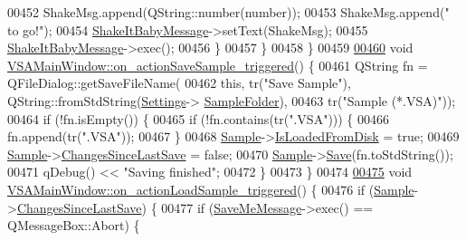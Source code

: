 \begin{DoxyCode}
{00452       ShakeMsg.append(QString::number(number));
00453       ShakeMsg.append(\textcolor{stringliteral}{" to go!"});
00454       \hyperlink{class_v_s_a_main_window_a819fbdf1137bb5f88c6638b0a9213f8c}{ShakeItBabyMessage}->setText(ShakeMsg);
00455       \hyperlink{class_v_s_a_main_window_a819fbdf1137bb5f88c6638b0a9213f8c}{ShakeItBabyMessage}->exec();
00456     \}
00457   \}
00458 \}
00459 
\hypertarget{vsamainwindow_8cpp_source_l00460}{}\hyperlink{class_v_s_a_main_window_a343178f350d9f2cb3067c75f995169f3}{00460} \textcolor{keywordtype}{void} \hyperlink{class_v_s_a_main_window_a343178f350d9f2cb3067c75f995169f3}{VSAMainWindow::on\_actionSaveSample\_triggered}() \{
00461   QString fn = QFileDialog::getSaveFileName(
00462       \textcolor{keyword}{this}, tr(\textcolor{stringliteral}{"Save Sample"}), QString::fromStdString(\hyperlink{class_v_s_a_main_window_a429310b9a60f66c4283dc609f869b48d}{Settings}->
      \hyperlink{class_soil_analyzer_1_1_soil_settings_adfd46a349d927988c955fa064fc7bf1a}{SampleFolder}),
00463       tr(\textcolor{stringliteral}{"Sample (*.VSA)"}));
00464   \textcolor{keywordflow}{if} (!fn.isEmpty()) \{
00465     \textcolor{keywordflow}{if} (!fn.contains(tr(\textcolor{stringliteral}{".VSA"}))) \{
00466       fn.append(tr(\textcolor{stringliteral}{".VSA"}));
00467     \}
00468     \hyperlink{class_v_s_a_main_window_a09d2f0c3ef8247e9c46932f866cab132}{Sample}->\hyperlink{class_soil_analyzer_1_1_sample_ad078b5aae9d86f5d8fc7ec871381b138}{IsLoadedFromDisk} = \textcolor{keyword}{true};
00469     \hyperlink{class_v_s_a_main_window_a09d2f0c3ef8247e9c46932f866cab132}{Sample}->\hyperlink{class_soil_analyzer_1_1_sample_aee3c3cf30c0201c695d82ca3a8dd0d8b}{ChangesSinceLastSave} = \textcolor{keyword}{false};
00470     \hyperlink{class_v_s_a_main_window_a09d2f0c3ef8247e9c46932f866cab132}{Sample}->\hyperlink{class_soil_analyzer_1_1_sample_acb0fa4729d078f7c8fba70411469a67d}{Save}(fn.toStdString());
00471     qDebug() << \textcolor{stringliteral}{"Saving finished"};
00472   \}
00473 \}
00474 
\hypertarget{vsamainwindow_8cpp_source_l00475}{}\hyperlink{class_v_s_a_main_window_a09c50b7552a1636c01c4f2f2817a223c}{00475} \textcolor{keywordtype}{void} \hyperlink{class_v_s_a_main_window_a09c50b7552a1636c01c4f2f2817a223c}{VSAMainWindow::on\_actionLoadSample\_triggered}() \{
00476   \textcolor{keywordflow}{if} (\hyperlink{class_v_s_a_main_window_a09d2f0c3ef8247e9c46932f866cab132}{Sample}->\hyperlink{class_soil_analyzer_1_1_sample_aee3c3cf30c0201c695d82ca3a8dd0d8b}{ChangesSinceLastSave}) \{
00477     \textcolor{keywordflow}{if} (\hyperlink{class_v_s_a_main_window_a9d76854fefeb5abf8f2fd6089987a31c}{SaveMeMessage}->exec() == QMessageBox::Abort) \{
}
\end{DoxyCode}
